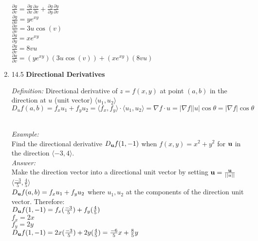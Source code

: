 \documentclass[11pt]{article}
\begin{document}
\begin{enumerate}
    \\
    \\
    $\frac{\partial g}{\partial v}=\frac{\partial g}{\partial x}\frac{\partial x}{\partial v}+\frac{\partial g}{\partial y}\frac{\partial y}{\partial v}$
    \\
    $\frac{\partial g}{\partial x}=ye^{xy}$
    \\
    $\frac{\partial x}{\partial v}=3u \cos(v)$
    \\
    $\frac{\partial g}{\partial y}=xe^{xy}$
    \\
    $\frac{\partial y}{\partial v}=8vu$
    \\
    $\frac{\partial g}{\partial v}=(ye^{xy})(3u \cos(v))+ (xe^{xy}) (8vu) $



\item 14.5 \textbf{Directional Derivatives}
\\
\begin{center}
\textit{Definition:}
Directional derivative of $z=f(x,y)$ at point $(a,b)$ in the direction at $u$ (unit vector) $\langle u_1, u_2 \rangle$
\\
$D_u f (a,b)= f_x u_1 + f_y u_2 = \langle f_x, f_y \rangle \cdot \langle u_1, u_2 \rangle = \nabla f \cdot u= |\nabla f||u| \cos \theta= |\nabla f| \cos \theta$
\end{center}
\\
\textit{Example:}
\\
 Find the directional derivative $D_{{\bf u}}f(1, -1)$ when $f(x,y) = x^2 + y^2$ for ${\bf u}$ in the direction $\langle -3, 4 \rangle$. 
    \\
    \textit{Answer:}
    \\
    Make the direction vector into a directional unit vector by setting ${\bf u}=\frac{\bf u}{||u||}$
    \\
    $\langle \frac{-3}{5}, \frac{4}{5} \rangle$
    \\
    
    $D_{{\bf u}}f(a, b)=f_x u_1+f_y u_2$ where $u_1,u_2$ at the components of the direction unit vector. Therefore:
    \\
    $D_{{\bf u}}f(1, -1)=f_x(\frac{-3}{5})+f_y(\frac{4}{5})$
    \\
    $f_x=2x$
    \\
    $f_y=2y$
    \\
    $D_{{\bf u}}f(1, -1)=2x(\frac{-3}{5})+2y(\frac{4}{5})=\frac{-6}{5}x+\frac{8}{5}y$
    
    
    

\end{enumerate}
\end{document}

